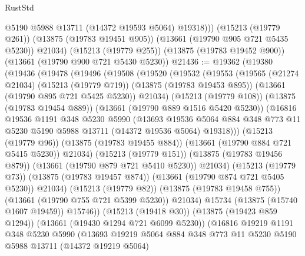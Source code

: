 \begin{lexlean}{RustStd}
\begin{coremodule}
            @5190
            @5988
            @13711
            (@14372 @19593 @5064)
            @19318)))
      (@15213 (@19779 @261))
      (@13875 (@19783 @19451 @905))
      (@13661 (@19790 @905 @721 @5435 @5230))
      @21034)
    (@15213 (@19779 @255))
    (@13875 (@19783 @19452 @900))
    (@13661 (@19790 @900 @721 @5430 @5230))
@21436 := @19362
    (@19380
      (@19436
        (@19478
          (@19496
            (@19508
              (@19520
                (@19532
                  (@19553
                    (@19565
                      (@21274 @21034)
                      (@15213 (@19779 @719))
                      (@13875 (@19783 @19453 @895))
                      (@13661 (@19790 @895 @721 @5425 @5230))
                      @21034)
                    (@15213 (@19779 @108))
                    (@13875 (@19783 @19454 @889))
                    (@13661 (@19790 @889 @1516 @5420 @5230))
                    (@16816
                      @19536
                      @1191
                      @348
                      @5230
                      @5990
                      (@13693
                        @19536
                        @5064
                        @884
                        @348
                        @773
                        @11
                        @5230
                        @5190
                        @5988
                        @13711
                        (@14372 @19536 @5064)
                        @19318)))
                  (@15213 (@19779 @96))
                  (@13875 (@19783 @19455 @884))
                  (@13661 (@19790 @884 @721 @5415 @5230))
                  @21034)
                (@15213 (@19779 @151))
                (@13875 (@19783 @19456 @879))
                (@13661 (@19790 @879 @721 @5410 @5230))
                @21034)
              (@15213 (@19779 @73))
              (@13875 (@19783 @19457 @874))
              (@13661 (@19790 @874 @721 @5405 @5230))
              @21034)
            (@15213 (@19779 @82))
            (@13875 (@19783 @19458 @755))
            (@13661 (@19790 @755 @721 @5399 @5230))
            @21034)
          @15734
          (@13875 (@15740 @1607 @19459))
          @15746))
      (@15213 (@19418 @30))
      (@13875 (@19423 @859 @1294))
      (@13661 (@19430 @1294 @721 @6099 @5230))
      (@16816
        @19219
        @1191
        @348
        @5230
        @5990
        (@13693
          @19219
          @5064
          @884
          @348
          @773
          @11
          @5230
          @5190
          @5988
          @13711
          (@14372 @19219 @5064)

\end{coremodule}
\end{lexlean}
